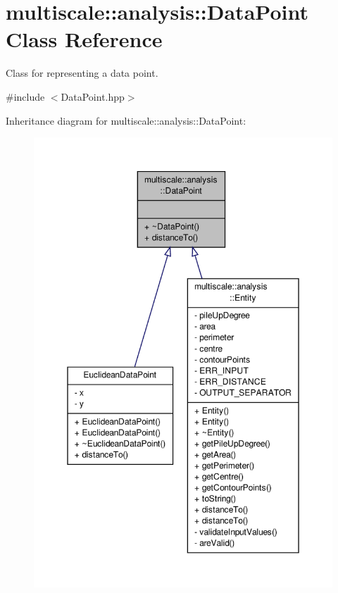 \hypertarget{classmultiscale_1_1analysis_1_1DataPoint}{\section{multiscale\-:\-:analysis\-:\-:Data\-Point Class Reference}
\label{classmultiscale_1_1analysis_1_1DataPoint}
}


Class for representing a data point.  




{\ttfamily \#include $<$Data\-Point.\-hpp$>$}



Inheritance diagram for multiscale\-:\-:analysis\-:\-:Data\-Point\-:\nopagebreak
\begin{figure}[H]
\begin{center}
\leavevmode
\includegraphics[width=350pt]{classmultiscale_1_1analysis_1_1DataPoint__inherit__graph}
\end{center}
\end{figure}


